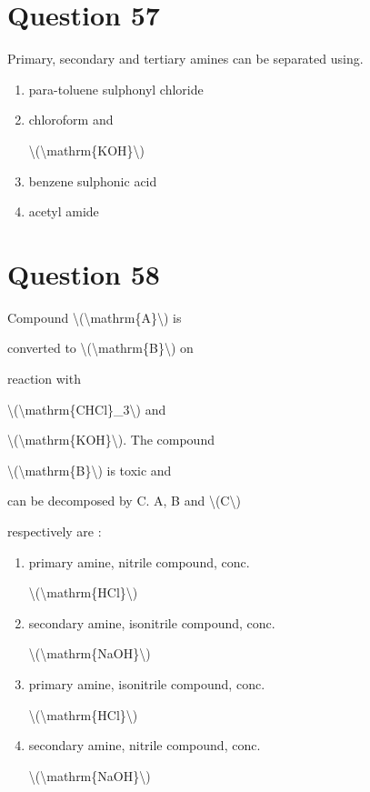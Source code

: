\documentclass{article}
\begin{document}
\section*{Question 57}
Primary, secondary and tertiary amines can be separated using.


\begin{enumerate}[label=(\alph*)]
\item para-toluene sulphonyl chloride


\item chloroform and

\textbackslash(\textbackslash mathrm\{KOH\}\textbackslash)


\item benzene sulphonic acid


\item acetyl amide


\end{enumerate}
\newpage
\section*{Question 58}
Compound \textbackslash(\textbackslash mathrm\{A\}\textbackslash) is

converted to \textbackslash(\textbackslash mathrm\{B\}\textbackslash) on

reaction with

\textbackslash(\textbackslash mathrm\{CHCl\}\_3\textbackslash) and

\textbackslash(\textbackslash mathrm\{KOH\}\textbackslash). The compound

\textbackslash(\textbackslash mathrm\{B\}\textbackslash) is toxic and

can be decomposed by C. A, B and \textbackslash(C\textbackslash)

respectively are :


\begin{enumerate}[label=(\alph*)]
\item primary amine, nitrile compound, conc.

\textbackslash(\textbackslash mathrm\{HCl\}\textbackslash)


\item secondary amine, isonitrile compound, conc.

\textbackslash(\textbackslash mathrm\{NaOH\}\textbackslash)


\item primary amine, isonitrile compound, conc.

\textbackslash(\textbackslash mathrm\{HCl\}\textbackslash)


\item secondary amine, nitrile compound, conc.

\textbackslash(\textbackslash mathrm\{NaOH\}\textbackslash)


\end{enumerate}
\newpage
\end{document}
